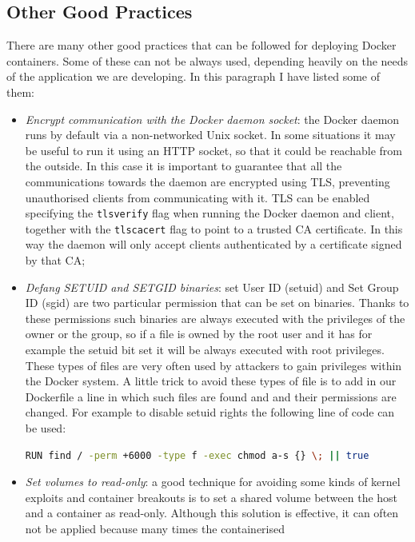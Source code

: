 \documentclass[a4paper,12pt]{article}
\newcommand{\code}[1]{\lstinline|#1|}
\begin{document}
\subsection{Other Good Practices}

There are many other good practices that can be followed for deploying Docker
containers. Some of these can not be always used, depending heavily on the needs
of the application we are developing. In this paragraph I have listed some of
them:
\begin{itemize}
  \item \textit{Encrypt communication with the Docker daemon socket}: the Docker
  daemon runs by default via a non-networked Unix socket. In some situations it
  may be useful to run it using an HTTP socket, so that it could be reachable
  from the outside. In this case it is important to guarantee that all the
  communications towards the daemon are encrypted using TLS, preventing
  unauthorised clients from communicating with it. TLS can be enabled specifying
  the \code{tlsverify} flag when running the Docker daemon and client,
  together with the \code{tlscacert} flag to point to a trusted CA
  certificate. In this way the daemon will only accept clients authenticated by
  a certificate signed by that CA;
  \item \textit{Defang SETUID and SETGID binaries}: set User ID (setuid) and
  Set Group ID (sgid) are two particular permission that can be set on binaries.
  Thanks to these permissions such binaries are always executed with the
  privileges of the owner or the group, so if a file is owned by the root user
  and it has for example the setuid bit set it will be always executed with root
  privileges. These types of files are very often used by attackers to gain
  privileges within the Docker system. A little trick to avoid these types of
  file is to add in our Dockerfile a line in which such files are found and and
  their permissions are changed. For example to disable setuid rights the
  following line of code can be used:
  \begin{lstlisting}[language=bash,breaklines]
    RUN find / -perm +6000 -type f -exec chmod a-s {} \; || true
  \end{lstlisting}
  \item \textit{Set volumes to read-only}: a good technique for avoiding some
  kinds of kernel exploits and container breakouts is to set a shared volume
  between the host and a container as read-only. Although this solution is
  effective, it can often not be applied because many times the containerised

\end{itemize}
\end{document}
